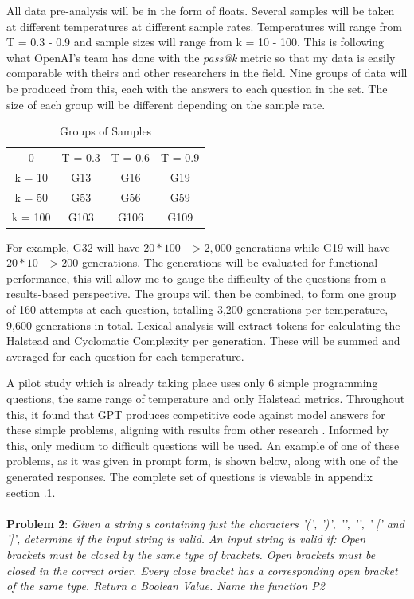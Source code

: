 \documentclass[manuscript,screen,review,sigconf]{acmart}
\begin{document}
All data pre-analysis will be in the form of floats. Several samples will be taken at different temperatures at different sample rates. Temperatures will range from T = 0.3 - 0.9 and sample sizes will range from k = 10 - 100. This is following what OpenAI's team has done with the \textit{pass@k} metric so that my data is easily comparable with theirs and other researchers in the field. Nine groups of data will be produced from this, each with the answers to each question in the set. The size of each group will be different depending on the sample rate.

\begin{table}[H]
    \centering
    \begin{tabular}{c|c|c|c}
        0 & T = 0.3 & T = 0.6 & T = 0.9\\
        k = 10 & G13 & G16 & G19\\
        k = 50 & G53 & G56 & G59\\
        k = 100 & G103 & G106 & G109\\
    \end{tabular}
    \caption{Groups of Samples}
    \label{tab:sampleGroups}
    \vspace{-10mm}
\end{table}

For example, G32 will have \(20 * 100 -> 2,000\) generations while G19 will have \(20 * 10 -> 200\) generations. The generations will be evaluated for functional performance, this will allow me to gauge the difficulty of the questions from a results-based perspective. The groups will then be combined, to form one group of 160 attempts at each question, totalling 3,200 generations per temperature, 9,600 generations in total. Lexical analysis will extract tokens for calculating the Halstead and Cyclomatic Complexity per generation. These will be summed and averaged for each question for each temperature.

A pilot study which is already taking place uses only 6 simple programming questions, the same range of temperature and only Halstead metrics. Throughout this, it found that GPT produces competitive code against model answers for these simple problems, aligning with results from other research \cite{Codex_CS1_CS2_Test}. Informed by this, only medium to difficult questions will be used. An example of one of these problems, as it was given in prompt form, is shown below, along with one of the generated responses. The complete set of questions is viewable in appendix section .1.
\\ \\
\textbf{Problem 2}: \textit{Given a string s containing just the characters '(', ')', '{', '}', ' [' and ']', determine if the input string is valid. An input string is valid if: Open brackets must be closed by the same type of brackets. Open brackets must be closed in the correct order. Every close bracket has a corresponding open bracket of the same type. Return a Boolean Value. Name the function P2}
\end{document}
